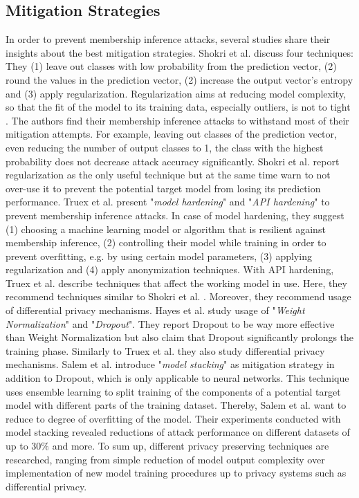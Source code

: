 \documentclass[runningheads]{llncs}
\begin{document}
\subsection{Mitigation Strategies}

In order to prevent membership inference attacks, several studies share their insights about the best mitigation strategies.
Shokri et al. \cite{shokri2017membership} discuss four techniques: They (1) leave out classes with low probability from the prediction vector, (2) round the values in the prediction vector, (2) increase the output vector's entropy and (3) apply regularization. Regularization aims at reducing model complexity, so that the fit of the model to its training data, especially outliers, is not to tight \cite{ng2004feature}. The authors find their membership inference attacks to withstand most of their mitigation attempts. For example, leaving out classes of the prediction vector, even reducing the number of output classes to 1, the class with the highest probability does not decrease attack accuracy significantly. Shokri et al. report regularization as the only useful technique but at the same time warn to not over-use it to prevent the potential target model from losing its prediction performance.
Truex et al. \cite{truex2018towards} present "\textit{model hardening}" and "\textit{API hardening}" to prevent membership inference attacks. In case of model hardening, they suggest (1) choosing a machine learning model or algorithm that is resilient against membership inference, (2) controlling their model while training in order to prevent overfitting, e.g. by using certain model parameters, (3) applying regularization and (4) apply anonymization techniques. With API hardening, Truex et al. describe techniques that affect the working model in use. Here, they recommend techniques similar to Shokri et al. \cite{shokri2017membership}. Moreover, they recommend usage of differential privacy mechanisms. 
Hayes et al. \cite{hayes2017logan} study usage of "\textit{Weight Normalization}" and "\textit{Dropout}". They report Dropout to be way more effective than Weight Normalization but also claim that Dropout significantly prolongs the training phase. Similarly to Truex et al. they also study differential privacy mechanisms.
Salem et al. \cite{salem2018ml} introduce "\textit{model stacking}" as mitigation strategy in addition to Dropout, which is only applicable to neural networks. This technique uses ensemble learning to split training of the components of a potential target model with different parts of the training dataset. Thereby, Salem et al. want to reduce to degree of overfitting of the model. Their experiments conducted with model stacking revealed reductions of attack performance on different datasets of up to $30\%$ and more.
To sum up, different privacy preserving techniques are researched, ranging from simple reduction of model output complexity over implementation of new model training procedures up to privacy systems such as differential privacy.
\end{document}
